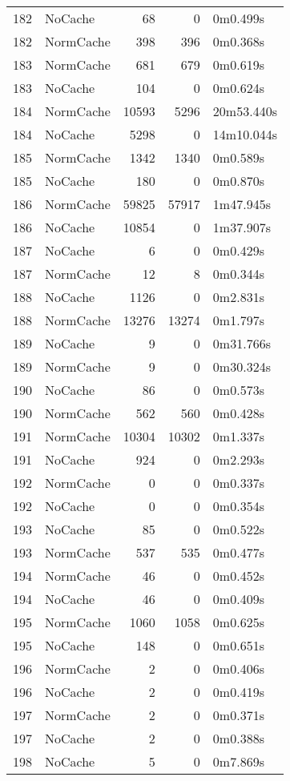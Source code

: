 \begin{tabular}{llrrl}
182 & NoCache & 68 & 0 & 0m0.499s \\
182 & NormCache & 398 & 396 & 0m0.368s \\
183 & NormCache & 681 & 679 & 0m0.619s \\
183 & NoCache & 104 & 0 & 0m0.624s \\
184 & NormCache & 10593 & 5296 & 20m53.440s \\
184 & NoCache & 5298 & 0 & 14m10.044s \\
185 & NormCache & 1342 & 1340 & 0m0.589s \\
185 & NoCache & 180 & 0 & 0m0.870s \\
186 & NormCache & 59825 & 57917 & 1m47.945s \\
186 & NoCache & 10854 & 0 & 1m37.907s \\
187 & NoCache & 6 & 0 & 0m0.429s \\
187 & NormCache & 12 & 8 & 0m0.344s \\
188 & NoCache & 1126 & 0 & 0m2.831s \\
188 & NormCache & 13276 & 13274 & 0m1.797s \\
189 & NoCache & 9 & 0 & 0m31.766s \\
189 & NormCache & 9 & 0 & 0m30.324s \\
190 & NoCache & 86 & 0 & 0m0.573s \\
190 & NormCache & 562 & 560 & 0m0.428s \\
191 & NormCache & 10304 & 10302 & 0m1.337s \\
191 & NoCache & 924 & 0 & 0m2.293s \\
192 & NormCache & 0 & 0 & 0m0.337s \\
192 & NoCache & 0 & 0 & 0m0.354s \\
193 & NoCache & 85 & 0 & 0m0.522s \\
193 & NormCache & 537 & 535 & 0m0.477s \\
194 & NormCache & 46 & 0 & 0m0.452s \\
194 & NoCache & 46 & 0 & 0m0.409s \\
195 & NormCache & 1060 & 1058 & 0m0.625s \\
195 & NoCache & 148 & 0 & 0m0.651s \\
196 & NormCache & 2 & 0 & 0m0.406s \\
196 & NoCache & 2 & 0 & 0m0.419s \\
197 & NormCache & 2 & 0 & 0m0.371s \\
197 & NoCache & 2 & 0 & 0m0.388s \\
198 & NoCache & 5 & 0 & 0m7.869s \\

\end{tabular}
